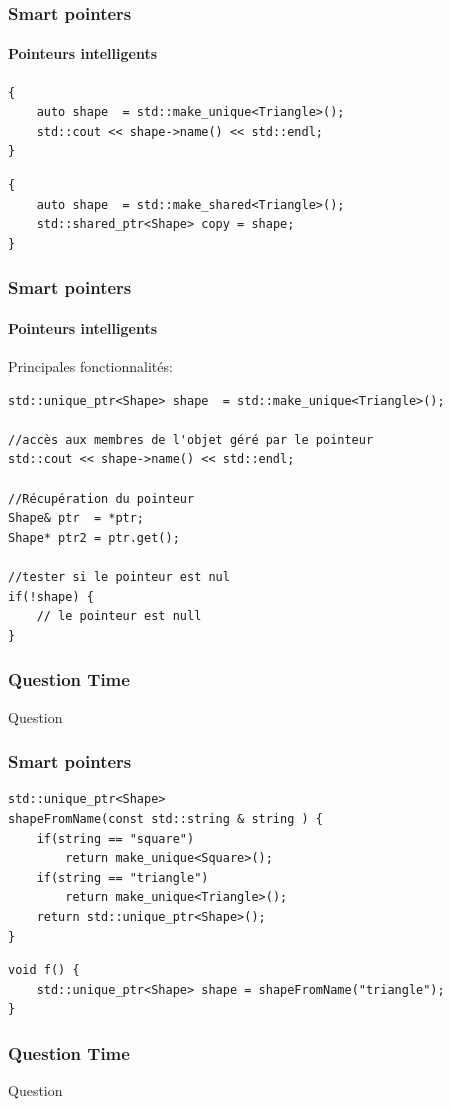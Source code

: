 \documentclass[xetex,mathserif]{beamer}
\newcounter{QC}
\begin{document}
\begin{frame}[fragile]
\frametitle{Smart pointers}
\framesubtitle{Pointeurs intelligents}

\begin{lstlisting}
{
    auto shape  = std::make_unique<Triangle>();
    std::cout << shape->name() << std::endl;
}
\end{lstlisting}

\begin{lstlisting}
{
    auto shape  = std::make_shared<Triangle>();
    std::shared_ptr<Shape> copy = shape;
}
\end{lstlisting}
\end{frame}


\begin{frame}[fragile]
\frametitle{Smart pointers}
\framesubtitle{Pointeurs intelligents}

Principales fonctionnalités:
\begin{lstlisting}
std::unique_ptr<Shape> shape  = std::make_unique<Triangle>();

//accès aux membres de l'objet géré par le pointeur
std::cout << shape->name() << std::endl;

//Récupération du pointeur
Shape& ptr  = *ptr;
Shape* ptr2 = ptr.get();

//tester si le pointeur est nul
if(!shape) {
	// le pointeur est null
}
\end{lstlisting}
\end{frame}

\begin{frame}
\frametitle{Question Time}
\huge Question  
\end{frame}

\begin{frame}[fragile]
\frametitle{Smart pointers}

\begin{lstlisting}
std::unique_ptr<Shape>
shapeFromName(const std::string & string ) {
    if(string == "square")
        return make_unique<Square>();
    if(string == "triangle")
        return make_unique<Triangle>();
    return std::unique_ptr<Shape>();
}
\end{lstlisting}
\pause
\begin{lstlisting}
void f() {
    std::unique_ptr<Shape> shape = shapeFromName("triangle");
}
\end{lstlisting}
\end{frame}

\begin{frame}
\frametitle{Question Time}
\huge Question  
\end{frame}
\end{document}
